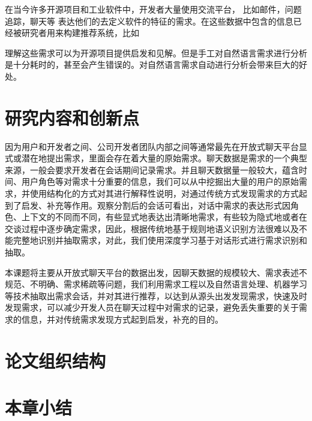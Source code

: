 在当今许多开源项目和工业软件中，开发者大量使用交流平台， 比如邮件，问题追踪，聊天等 \cite{panichella2014developers}表达他们的去定义软件的特征的需求\cite{fitzgerald2006transformation}。在这些数据中包含的信息已经被研究者用来构建推荐系统，比如

理解这些需求可以为开源项目提供启发和见解。但是手工对自然语言需求进行分析是十分耗时的，甚至会产生错误的。对自然语言需求自动进行分析会带来巨大的好处。


\section{研究内容和创新点}

因为用户和开发者之间、公司开发者团队内部之间等通常最先在开放式聊天平台显式或潜在地提出需求，里面会存在着大量的原始需求。聊天数据是需求的一个典型来源，一般会要求开发者在会话期间记录需求。并且聊天数据量一般较大，蕴含时间、用户角色等对需求十分重要的信息，我们可以从中挖掘出大量的用户的原始需求，并使用结构化的方式对其进行解释性说明，对通过传统方式发现需求的方式起到了启发、补充等作用。观察分割后的会话可看出，对话中需求的表达形式因角色、上下文的不同而不同，有些显式地表达出清晰地需求，有些较为隐式地或者在交谈过程中逐步确定需求，因此，根据传统地基于规则地语义识别方法很难以及不能完整地识别并抽取需求，对此，我们使用深度学习基于对话形式进行需求识别和抽取。


本课题将主要从开放式聊天平台的数据出发，因聊天数据的规模较大、需求表述不规范、不明确、需求稀疏等问题，我们利用需求工程以及自然语言处理、机器学习等技术抽取出需求会话，并对其进行推荐，以达到从源头出发发现需求，快速及时发现需求，可以减少开发人员在聊天过程中对需求的记录，避免丢失重要的关于需求的信息，并对传统需求发现方式起到启发，补充的目的。

\section{论文组织结构}



\section{本章小结}

